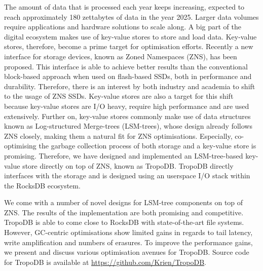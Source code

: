 \begin{abstracts}
    The amount of data that is processed each year keeps increasing, expected to reach approximately 180 zettabytes of data in the year 2025. Larger data volumes require applications and hardware solutions to scale along. A big part of the digital
    ecosystem makes use of key-value stores to store and load data. Key-value stores, therefore, become a prime target for
    optimisation efforts.
    Recently a new interface for storage devices, known as Zoned Namespaces (ZNS), has been proposed. This interface
    is able to achieve better results than the conventional block-based approach when used on flash-based SSDs, both in performance and
    durability. Therefore, there is an interest by both industry and academia to shift to the usage of ZNS SSDs.
    Key-value stores are also a target for this shift because key-value stores are I/O heavy, require high performance and are used
    extensively. Further on, key-value stores commonly make use of data structures known as Log-structured Merge-trees
    (LSM-trees), whose design already follows ZNS closely, making them a natural
    fit for ZNS optimisations. 
    Especially, co-optimising the garbage collection process of both storage and a key-value store is promising. Therefore, we have designed and implemented an LSM-tree-based key-value store directly on top of ZNS, known as TropoDB. TropoDB directly interfaces with the storage and is designed using an userspace I/O stack within the RocksDB ecosystem.
    
    We come with a number of novel designs for LSM-tree components on top of ZNS. The results of the implementation are both promising and competitive. TropoDB is able to come close to RocksDB with state-of-the-art file systems. However, GC-centric optimisations show limited gains in regards to tail latency, write amplification and numbers of erasures. To improve the performance gains, we present and discuss various optimisation avenues for TropoDB. Source code for TropoDB is available at \url{https://github.com/Krien/TropoDB}.
    \end{abstracts}

    